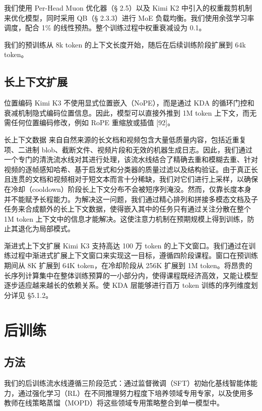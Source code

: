 \documentclass[
  10
]{article}
\begin{document}
我们使用 Per-Head Muon 优化器（§ 2.5）以及 Kimi K2 中引入的权重裁剪机制来优化模型，同时采用 QB（§ 2.3.3）进行 MoE 负载均衡。我们使用余弦学习率调度，配合 1\% 的线性预热。整个训练过程中权重衰减设为 0.1。

我们的预训练从 8k token 的上下文长度开始，随后在后续训练阶段扩展到 64k token。

\subsection{长上下文扩展}\label{long-context-extension}

位置编码 Kimi K3 不使用显式位置嵌入（NoPE），而是通过 KDA 的循环门控和衰减机制隐式编码位置信息。因此，模型可以直接外推到 1M token 上下文，而无需任何位置编码修改，例如 RoPE 重缩放或插值 {[}92{]}。

长上下文数据 来自自然来源的长文档和视频包含大量低质量内容，包括近重复项、二进制 blob、截断文件、视频片段和无效的机器生成日志。因此，我们通过一个专门的清洗流水线对其进行处理，该流水线结合了精确去重和模糊去重、针对视频的逐帧感知哈希、基于启发式和分类器的质量过滤以及结构验证。由于真正长且连贯的文档和视频相对于短文本而言十分稀缺，我们对它们进行上采样，以确保在冷却（cooldown）阶段长上下文分布不会被短序列淹没。然而，仅靠长度本身并不能赋予长程能力。为解决这一问题，我们通过精心排列和拼接多模态文档及子任务来合成额外的长上下文数据，使得嵌入其中的任务只有通过关注分散在整个 1M token 上下文中的信息才能解决。这使注意力机制在预期规模上得到训练，防止其退化为局部模式。

渐进式上下文扩展 Kimi K3 支持高达 100 万 token 的上下文窗口。我们通过在训练过程中渐进式扩展上下文窗口来实现这一目标，遵循四阶段课程。窗口在预训练期间从 8K 扩展到 64K token，在冷却阶段从 256K 扩展到 1M token。将昂贵的长序列计算集中在整体训练预算的一小部分内，使得课程既经济高效，又能让模型逐步适应越来越长的依赖关系。使 KDA 层能够进行百万 token 训练的序列维度划分详见 §5.1.2。

\section{后训练}\label{post-training}

\subsection{方法}\label{method}

我们的后训练流水线遵循三阶段范式：通过监督微调（SFT）初始化基线智能体能力，通过强化学习（RL）在不同推理努力程度下培养领域专用专家，以及使用多教师在线策略蒸馏（MOPD）将这些领域专用策略整合到单一模型中。
\end{document}
